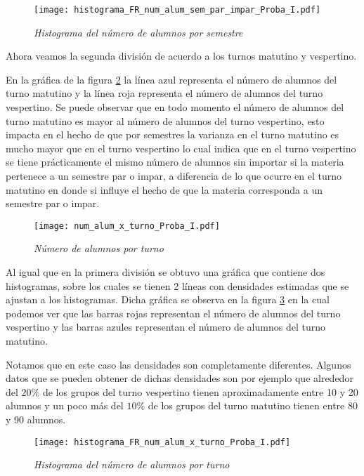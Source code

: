 \begin{figure}[h]
\centering
\texttt{[image: histograma\_FR\_num\_alum\_sem\_par\_impar\_Proba\_I.pdf]} %
\caption{\textit{Histograma del número de alumnos por semestre}} \label{HistAlumParImparProbaI}
\end{figure}


Ahora veamos la segunda división de acuerdo a los turnos matutino y vespertino.

En la gráfica de la figura \ref{num_alum_x_turno_Proba_I} la línea azul representa el número de alumnos del turno matutino y la línea roja representa el número de alumnos del turno vespertino. Se puede observar que en todo momento el número de alumnos del turno matutino es mayor al número de alumnos del turno vespertino, esto impacta en el hecho de que por semestres la varianza en el turno matutino es mucho mayor que en el turno vespertino lo cual indica que en el turno vespertino se tiene prácticamente el mismo número de alumnos sin importar si la materia pertenece a un semestre par o impar, a diferencia de lo que ocurre en el turno matutino en donde si influye el hecho de que la materia corresponda a un semestre par o impar.


\begin{figure}[h]
\centering
\texttt{[image: num\_alum\_x\_turno\_Proba\_I.pdf]} %
\caption{\textit{Número de alumnos por turno}}\label{num_alum_x_turno_Proba_I}
\end{figure}

Al igual que en la primera división se obtuvo una gráfica que contiene dos histogramas, sobre los cuales se tienen 2 líneas con  densidades estimadas que se ajustan a los histogramas. Dicha gráfica se observa en la figura \ref{HistAlumTurnoProbaI} en la cual podemos ver que las barras rojas representan el número de alumnos del turno vespertino y las barras azules representan el número de alumnos del turno matutino.

Notamos que en este caso las densidades son completamente diferentes. Algunos datos que se pueden obtener de dichas densidades son por ejemplo que alrededor del $20\%$ de los grupos del turno vespertino tienen aproximadamente entre 10 y 20 alumnos y un poco más del $10\%$ de los grupos del turno matutino tienen entre 80 y 90 alumnos.

\begin{figure}[h]
\centering
\texttt{[image: histograma\_FR\_num\_alum\_x\_turno\_Proba\_I.pdf]} %
\caption{\textit{Histograma del número de alumnos por turno}}\label{HistAlumTurnoProbaI}
\end{figure}

